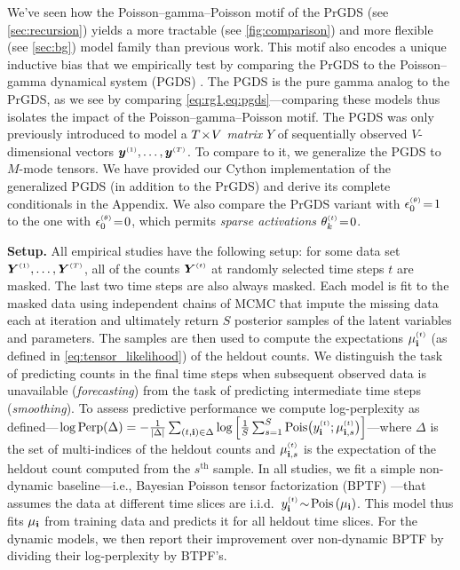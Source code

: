 \documentclass{article}
\begin{document}
We've seen how the Poisson--gamma--Poisson motif of the PrGDS (see \cref{sec:recursion}) yields a more tractable (see \cref{fig:comparison}) and more flexible (see \cref{sec:bg}) model family than previous work. This motif also encodes a unique inductive bias that we empirically test by comparing the PrGDS to the Poisson--gamma dynamical system (PGDS) \cite{schein2016poisson}. The PGDS is the pure gamma analog to the PrGDS, as we see by comparing \cref{eq:rg1,eq:pgds}---comparing these models thus isolates the impact of the Poisson--gamma--Poisson motif. The PGDS was only previously introduced to model a $T \!\times\! V$  \emph{matrix} $Y$ of sequentially observed $V$-dimensional vectors $\boldsymbol{y}^{\mathsmaller{(1)}},\dots, \boldsymbol{y}^{\mathsmaller{(T)}}$. To compare to it, we generalize the PGDS to $M$-mode tensors. We have provided our Cython implementation of the generalized PGDS (in addition to the PrGDS) and derive its complete conditionals in the Appendix. We also compare the PrGDS variant with $\epstheta \teq 1$ to the one with $\epstheta \teq 0$, which permits \emph{sparse activations} $\thetakt \teq 0$.~

\textbf{Setup.} All empirical studies have the following setup: for some data set $\Yten^{\mathsmaller{(1)}},\dots,\Yten^{\mathsmaller{(T)}}$, all of the counts $\Yten^{\mathsmaller{(t)}}$ at randomly selected time steps $t$ are masked. The last two time steps are also always masked. Each model is fit to the masked data using independent chains of MCMC that impute the missing data each at iteration and ultimately return $S$ posterior samples of the latent variables and parameters. The samples are then used to compute the expectations $\mudt$ (as defined in \cref{eq:tensor_likelihood}) of the heldout counts. We distinguish the task of predicting counts in the final time steps when subsequent observed data is unavailable (\emph{forecasting}) from the task of predicting intermediate time steps (\emph{smoothing}). To assess predictive performance we compute log-perplexity as defined---$\log \textrm{Perp}(\Delta) = -\frac{1}{|\Delta|}\sum_{(t,\osubs) \in \Delta} \log \Big[\frac{1}{S}\sum_{s=1}^S \textrm{Pois}\big(\ydt; \musdt \big) \Big]$---where $\Delta$ is the set of multi-indices of the heldout counts and $\musdt$ is the expectation of the heldout count computed from the $s^{\textrm{th}}$ sample. In all studies, we fit a simple non-dynamic baseline---i.e., Bayesian Poisson tensor factorization (BPTF) \cite{schein2015bayesian}---that assumes the data at different time slices are i.i.d.~$y_{\osubs}^{\mathsmaller{(t)}} \tsim \Pois{\mud}$. This model thus fits $\mu_{\textbf{\textrm{i}}}$ from training data and predicts it for all heldout time slices. For the dynamic models, we then report their improvement over non-dynamic BPTF by dividing their log-perplexity by BTPF's.~ 
\end{document}
